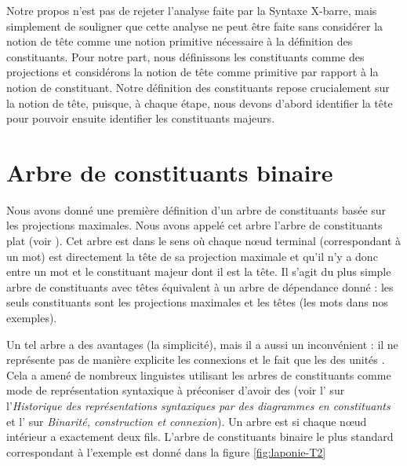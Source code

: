 {    Notre propos n’est pas de rejeter l’analyse faite par la Syntaxe X-barre, mais simplement de souligner que cette analyse ne peut être faite sans considérer la notion de tête comme une notion primitive nécessaire à la définition des constituants. Pour notre part, nous définissons les constituants comme des projections et considérons la notion de tête comme primitive par rapport à la notion de constituant. Notre définition des constituants repose crucialement sur la notion de tête, puisque, à chaque étape, nous devons d’abord identifier la tête pour pouvoir ensuite identifier les constituants majeurs.
}
\section{Arbre de constituants binaire}\label{sec:3.4.14}

Nous avons donné une première définition d’un arbre de constituants basée sur les projections maximales. Nous avons appelé cet arbre l’arbre de constituants plat (voir ). Cet arbre est  dans le sens où chaque nœud terminal (correspondant à un mot) est directement la tête de sa projection maximale et qu’il n’y a donc  entre un mot et le constituant majeur dont il est la tête. Il s’agit du plus simple arbre de constituants avec têtes équivalent à un arbre de dépendance donné : les seuls constituants sont les projections maximales et les têtes (les mots dans nos exemples).

Un tel arbre a des avantages (la simplicité), mais il a aussi un inconvénient : il ne représente pas de manière explicite les connexions et le fait que les  des unités . Cela a amené de nombreux linguistes utilisant les arbres de constituants comme mode de représentation syntaxique à préconiser d’avoir des  (voir l' sur l’\textit{Historique des représentations syntaxiques par des diagrammes en constituants} et l' sur \textit{Binarité, construction et connexion}). Un arbre est  si chaque nœud intérieur a exactement deux fils. L’arbre de constituants binaire le plus standard correspondant à l'exemple  est donné dans la figure \ref{fig:laponie-T2}

